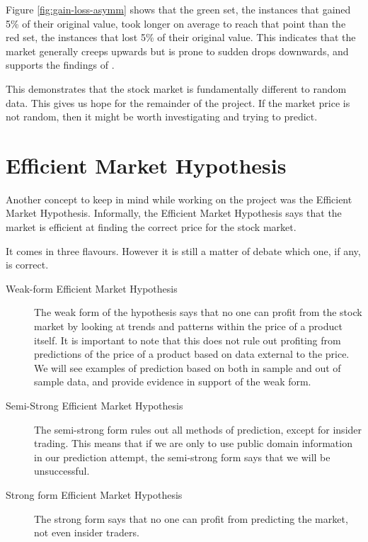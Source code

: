 \documentclass{report}
\begin{document}
Figure \ref{fig:gain-loss-asymm} shows that the green set, the instances that gained 5\% of their original value, took longer on average to reach that point than the red set, the instances that lost 5\% of their original value. This indicates that the market generally creeps upwards but is prone to sudden drops downwards, and supports the findings of \citet{karpio2007gain}.

This demonstrates that the stock market is fundamentally different to random data. This gives us hope for the remainder of the project. If the market price is not random, then it might be worth investigating and trying to predict.

\section{Efficient Market Hypothesis}

Another concept to keep in mind while working on the project was the Efficient Market Hypothesis. Informally, the Efficient Market Hypothesis says that the market is efficient at finding the correct price for the stock market.

It comes in three flavours. However it is still a matter of debate which one, if any, is correct.

\begin{description}
  \item[Weak-form Efficient Market Hypothesis] 
  The weak form of the hypothesis says that no one can profit from the stock market by looking at trends and patterns within the price of a product itself. It is important to note that this does not rule out profiting from predictions of the price of a product based on data external to the price. We will see examples of prediction based on both in sample and out of sample data, and provide evidence in support of the weak form.
  
  \item[Semi-Strong Efficient Market Hypothesis]
  The semi-strong form rules out all methods of prediction, except for insider trading. This means that if we are only to use public domain information in our prediction attempt, the semi-strong form says that we will be unsuccessful.
  
  \item[Strong form Efficient Market Hypothesis]
  The strong form says that no one can profit from predicting the market, not even insider traders.
\end{description}
\end{document}
